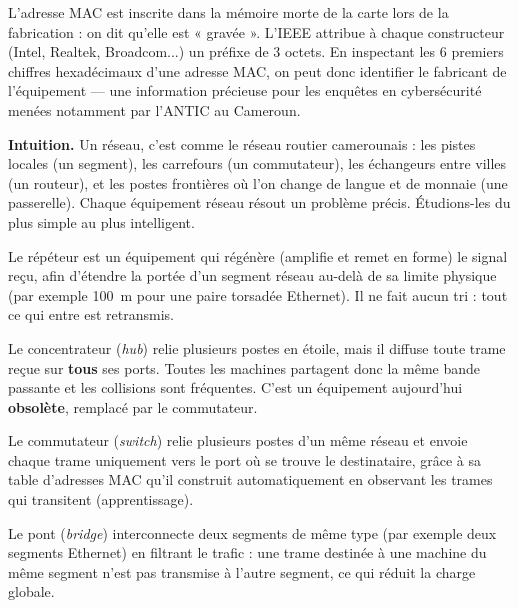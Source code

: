 \documentclass[11pt]{article}
\newcommand{\cle}[1]{{\popxbold\color{popdark}#1}}
\newcounter{popsec}
\newcounter{popsub}
\newcommand{\courssub}[1]{%
  \stepcounter{popsub}%
  \par\vspace{9pt}\noindent{\popxbold\fontsize{11.5}{13}\selectfont\color{popink}{\color{poporange}\thepopsec.\thepopsub}\hspace{6pt}#1}\par\nopagebreak\vspace{4pt}
}
\begin{document}
\begin{savaistu}
L'adresse MAC est inscrite dans la mémoire morte de la carte lors de la fabrication : on dit qu'elle est « gravée ». L'IEEE attribue à chaque constructeur (Intel, Realtek, Broadcom...) un préfixe de 3 octets. En inspectant les 6 premiers chiffres hexadécimaux d'une adresse MAC, on peut donc identifier le fabricant de l'équipement — une information précieuse pour les enquêtes en cybersécurité menées notamment par l'ANTIC au Cameroun.
\end{savaistu}

\courssub{Les équipements d'interconnexion}

\textbf{Intuition.} Un réseau, c'est comme le réseau routier camerounais : les pistes locales (un segment), les carrefours (un commutateur), les échangeurs entre villes (un routeur), et les postes frontières où l'on change de langue et de monnaie (une passerelle). Chaque équipement réseau résout un problème précis. Étudions-les du plus simple au plus intelligent.

\begin{definition}[Répéteur]
Le \cle{répéteur} est un équipement qui \cle{régénère} (amplifie et remet en forme) le signal reçu, afin d'étendre la portée d'un segment réseau au-delà de sa limite physique (par exemple \SI{100}{\meter} pour une paire torsadée Ethernet). Il ne fait aucun tri : tout ce qui entre est retransmis.
\end{definition}

\begin{definition}
Le \cle{concentrateur} (\emph{hub}) relie plusieurs postes en étoile, mais il \cle{diffuse} toute trame reçue sur \textbf{tous} ses ports. Toutes les machines partagent donc la même bande passante et les \cle{collisions} sont fréquentes. C'est un équipement aujourd'hui \textbf{obsolète}, remplacé par le commutateur.
\end{definition}

\begin{definition}
Le \cle{commutateur} (\emph{switch}) relie plusieurs postes d'un même réseau et envoie chaque trame \cle{uniquement vers le port} où se trouve le destinataire, grâce à sa \cle{table d'adresses MAC} qu'il construit automatiquement en observant les trames qui transitent (apprentissage).
\end{definition}

\begin{definition}
Le \cle{pont} (\emph{bridge}) interconnecte \cle{deux segments de même type} (par exemple deux segments Ethernet) en \cle{filtrant} le trafic : une trame destinée à une machine du même segment n'est pas transmise à l'autre segment, ce qui réduit la charge globale.
\end{definition}
\end{document}
